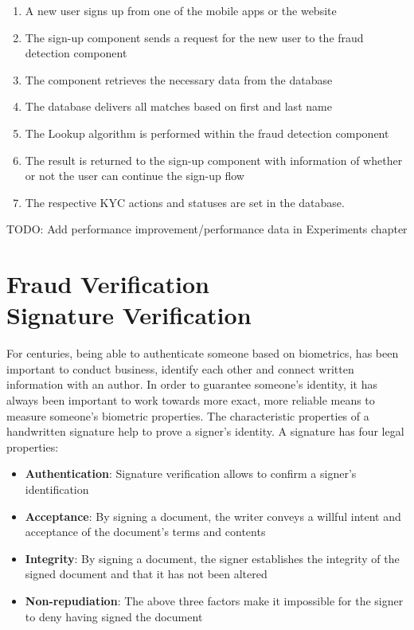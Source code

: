 \documentclass[a4paper, oneside]{csthesis}
\begin{document}
\begin{enumerate}
\item A new user signs up from one of the mobile apps or the website
\item The sign-up component sends a request for the new user to the fraud detection component
\item The component retrieves the necessary data from the database
\item The database delivers all matches based on first and last name
\item The Lookup algorithm is performed within the fraud detection component
\item The result is returned to the sign-up component with information of whether or not the user can continue the sign-up flow
\item The respective KYC actions and statuses are set in the database.
\end{enumerate}

TODO: Add performance improvement/performance data in Experiments chapter













\chapter{Fraud Verification \\Signature Verification}
\label{chp:signature-verification}

For centuries, being able to authenticate someone based on biometrics, has been important to conduct business, identify each other and connect written information with an author. In order to guarantee someone's identity, it has always been important to work towards more exact, more reliable means to measure someone's biometric properties. The characteristic properties of a handwritten signature help to prove a signer's identity. A signature has four legal properties: \cite{Hanmandlu05}

\begin{itemize}
\item \textbf{Authentication}: Signature verification allows to confirm a signer's identification
\item \textbf{Acceptance}: By signing a document, the writer conveys a willful intent and acceptance of the document's terms and contents
\item \textbf{Integrity}: By signing a document, the signer establishes the integrity of the signed document and that it has not been altered
\item \textbf{Non-repudiation}: The above three factors make it impossible for the signer to deny having signed the document
\end{itemize}
\end{document}
